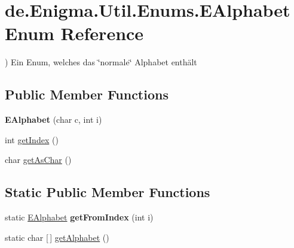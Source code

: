 \hypertarget{enumde_1_1_enigma_1_1_util_1_1_enums_1_1_e_alphabet}{}\section{de.\+Enigma.\+Util.\+Enums.\+E\+Alphabet Enum Reference}
\label{enumde_1_1_enigma_1_1_util_1_1_enums_1_1_e_alphabet}


) Ein Enum, welches das \char`\"{}normale\char`\"{} Alphabet enthält  


\subsection*{Public Member Functions}
\begin{DoxyCompactItemize}
\item 
\mbox{\label{enumde_1_1_enigma_1_1_util_1_1_enums_1_1_e_alphabet_a53563139df6bbf6ed8e642018a1d6baf}} 
{\bfseries E\+Alphabet} (char c, int i)
\item 
int \hyperlink{enumde_1_1_enigma_1_1_util_1_1_enums_1_1_e_alphabet_a9e9983168faaf9bb24090c3870ebbfa4}{get\+Index} ()
\item 
char \hyperlink{enumde_1_1_enigma_1_1_util_1_1_enums_1_1_e_alphabet_ab8be59c4d6bb5263147572911f75c5c5}{get\+As\+Char} ()
\end{DoxyCompactItemize}
\subsection*{Static Public Member Functions}
\begin{DoxyCompactItemize}
\item 
\mbox{\label{enumde_1_1_enigma_1_1_util_1_1_enums_1_1_e_alphabet_ace27f61bd32f821d82345654b3b45bf8}} 
static \hyperlink{enumde_1_1_enigma_1_1_util_1_1_enums_1_1_e_alphabet}{E\+Alphabet} {\bfseries get\+From\+Index} (int i)
\item 
static char \mbox{[}$\,$\mbox{]} \hyperlink{enumde_1_1_enigma_1_1_util_1_1_enums_1_1_e_alphabet_aebee015859ad2b6090c8ccf06fcdcd28}{get\+Alphabet} ()
\end{DoxyCompactItemize}
